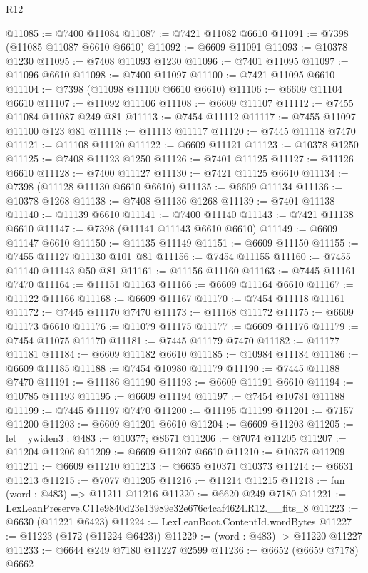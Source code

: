 \begin{lexlean}{R12}
\begin{coremodule}
@11085 := @7400 @11084
@11087 := @7421 @11082 @6610
@11091 := @7398 (@11085 @11087 @6610 @6610)
@11092 := @6609 @11091
@11093 := @10378 @1230
@11095 := @7408 @11093 @1230
@11096 := @7401 @11095
@11097 := @11096 @6610
@11098 := @7400 @11097
@11100 := @7421 @11095 @6610
@11104 := @7398 (@11098 @11100 @6610 @6610)
@11106 := @6609 @11104 @6610
@11107 := @11092 @11106
@11108 := @6609 @11107
@11112 := @7455 @11084 @11087 @249 @81
@11113 := @7454 @11112
@11117 := @7455 @11097 @11100 @123 @81
@11118 := @11113 @11117
@11120 := @7445 @11118 @7470
@11121 := @11108 @11120
@11122 := @6609 @11121
@11123 := @10378 @1250
@11125 := @7408 @11123 @1250
@11126 := @7401 @11125
@11127 := @11126 @6610
@11128 := @7400 @11127
@11130 := @7421 @11125 @6610
@11134 := @7398 (@11128 @11130 @6610 @6610)
@11135 := @6609 @11134
@11136 := @10378 @1268
@11138 := @7408 @11136 @1268
@11139 := @7401 @11138
@11140 := @11139 @6610
@11141 := @7400 @11140
@11143 := @7421 @11138 @6610
@11147 := @7398 (@11141 @11143 @6610 @6610)
@11149 := @6609 @11147 @6610
@11150 := @11135 @11149
@11151 := @6609 @11150
@11155 := @7455 @11127 @11130 @101 @81
@11156 := @7454 @11155
@11160 := @7455 @11140 @11143 @50 @81
@11161 := @11156 @11160
@11163 := @7445 @11161 @7470
@11164 := @11151 @11163
@11166 := @6609 @11164 @6610
@11167 := @11122 @11166
@11168 := @6609 @11167
@11170 := @7454 @11118 @11161
@11172 := @7445 @11170 @7470
@11173 := @11168 @11172
@11175 := @6609 @11173 @6610
@11176 := @11079 @11175
@11177 := @6609 @11176
@11179 := @7454 @11075 @11170
@11181 := @7445 @11179 @7470
@11182 := @11177 @11181
@11184 := @6609 @11182 @6610
@11185 := @10984 @11184
@11186 := @6609 @11185
@11188 := @7454 @10980 @11179
@11190 := @7445 @11188 @7470
@11191 := @11186 @11190
@11193 := @6609 @11191 @6610
@11194 := @10785 @11193
@11195 := @6609 @11194
@11197 := @7454 @10781 @11188
@11199 := @7445 @11197 @7470
@11200 := @11195 @11199
@11201 := @7157 @11200
@11203 := @6609 @11201 @6610
@11204 := @6609 @11203
@11205 := let _ywiden3 : @483 := @10377; @8671
@11206 := @7074 @11205
@11207 := @11204 @11206
@11209 := @6609 @11207 @6610
@11210 := @10376 @11209
@11211 := @6609 @11210
@11213 := @6635 @10371 @10373
@11214 := @6631 @11213
@11215 := @7077 @11205
@11216 := @11214 @11215
@11218 := fun (word : @483) => @11211 @11216
@11220 := @6620 @249 @7180
@11221 := LexLeanPreserve.C11e9840d23e13989e32e676c4caf4624.R12.__fits_8
@11223 := @6630 (@11221 @6423)
@11224 := LexLeanBoot.ContentId.wordBytes
@11227 := @11223 (@172 (@11224 @6423))
@11229 := (word : @483) -> @11220 @11227
@11233 := @6644 @249 @7180 @11227 @2599
@11236 := @6652 (@6659 @7178) @6662

\end{coremodule}
\end{lexlean}
